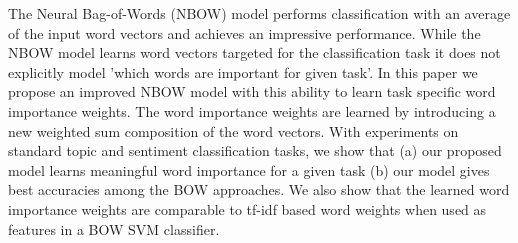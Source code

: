 The Neural Bag-of-Words (NBOW) model performs classification with an average of the input word vectors and achieves an impressive performance. While the NBOW model learns word vectors targeted for the classification task it does not explicitly model 'which words are important for given task'. In this paper we propose an improved NBOW model with this ability to learn task specific word importance weights. The word importance weights are learned by introducing a new weighted sum composition of the word vectors. With experiments on standard topic and sentiment classification tasks, we show that (a) our proposed model learns meaningful word importance for a given task (b) our model gives best accuracies among the BOW approaches. We also show that the learned word importance weights are comparable to tf-idf based word weights when used as features in a BOW SVM classifier.
